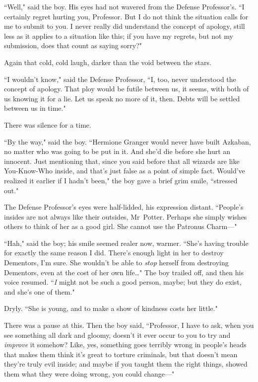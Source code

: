 ``Well," said the boy. His eyes had not wavered from the Defense Professor's. ``I certainly regret hurting you, Professor. But I do not think the situation calls for me to submit to you. I never really did understand the concept of apology, still less as it applies to a situation like this; if you have my regrets, but not my submission, does that count as saying sorry?"

Again that cold, cold laugh, darker than the void between the stars.

``I wouldn't know," said the Defense Professor, ``I, too, never understood the concept of apology. That ploy would be futile between us, it seems, with both of us knowing it for a lie. Let us speak no more of it, then. Debts will be settled between us in time."

There was silence for a time.

``By the way," said the boy. ``Hermione Granger would never have built Azkaban, no matter who was going to be put in it. And she'd die before she hurt an innocent. Just mentioning that, since you said before that all wizards are like You-Know-Who inside, and that's just false as a point of simple fact. Would've realized it earlier if I hadn't been," the boy gave a brief grim smile, ``stressed out."

The Defense Professor's eyes were half-lidded, his expression distant. ``People's insides are not always like their outsides, Mr~Potter. Perhaps she simply wishes others to think of her as a good girl. She cannot use the Patronus Charm—"

``Hah," said the boy; his smile seemed realer now, warmer. ``She's having trouble for exactly the same reason I did. There's enough light in her to destroy Dementors, I'm sure. She wouldn't be able to \emph{stop} herself from destroying Dementors, even at the cost of her own life{\ldots}" The boy trailed off, and then his voice resumed. ``\emph{I} might not be such a good person, maybe; but they do exist, and she's one of them."

Dryly. ``She is young, and to make a show of kindness costs her little."

There was a pause at this. Then the boy said, ``Professor, I have to ask, when you see something all dark and gloomy, doesn't it ever occur to you to try and \emph{improve} it somehow? Like, yes, something goes terribly wrong in people's heads that makes them think it's great to torture criminals, but that doesn't mean they're truly evil inside; and maybe if you taught them the right things, showed them what they were doing wrong, you could change—"

